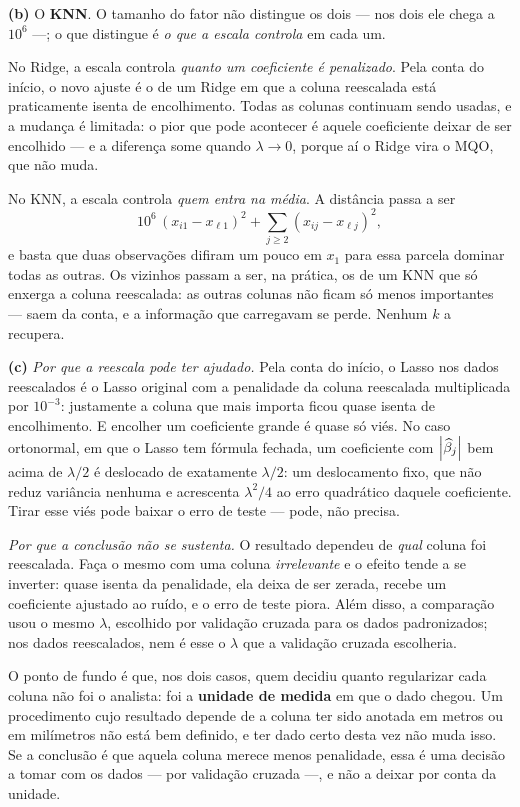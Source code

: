 \begin{solucao}
\smallskip
\textbf{(b)} O \textbf{KNN}. O tamanho do fator não distingue os dois --- nos dois ele
chega a $10^6$ ---; o que distingue é \emph{o que a escala controla} em cada um.

No Ridge, a escala controla \emph{quanto um coeficiente é penalizado}. Pela conta do
início, o novo ajuste é o de um Ridge em que a coluna reescalada está praticamente
isenta de encolhimento. Todas as colunas continuam sendo usadas, e a mudança é limitada:
o pior que pode acontecer é aquele coeficiente deixar de ser encolhido --- e a diferença
some quando $\lambda\to0$, porque aí o Ridge vira o MQO, que não muda.

No KNN, a escala controla \emph{quem entra na média}. A distância passa a ser
\[
  10^6\,(x_{i1}-x_{\ell1})^2+\sum_{j\ge2}(x_{ij}-x_{\ell j})^2 ,
\]
e basta que duas observações difiram um pouco em $x_1$ para essa parcela dominar todas
as outras. Os vizinhos passam a ser, na prática, os de um KNN que só enxerga a coluna
reescalada: as outras colunas não ficam só menos importantes --- saem da conta, e a
informação que carregavam se perde. Nenhum $k$ a recupera.

\smallskip
\textbf{(c)} \emph{Por que a reescala pode ter ajudado.} Pela conta do início, o Lasso
nos dados reescalados é o Lasso original com a penalidade da coluna reescalada
multiplicada por $10^{-3}$: justamente a coluna que mais importa ficou quase isenta de
encolhimento. E encolher um coeficiente grande é quase só viés. No caso ortonormal, em
que o Lasso tem fórmula fechada, um coeficiente com $\left\lvert \widehat\beta_j \right\rvert$ bem acima de
$\lambda/2$ é deslocado de exatamente $\lambda/2$: um deslocamento fixo, que não reduz
variância nenhuma e acrescenta $\lambda^2/4$ ao erro quadrático daquele coeficiente.
Tirar esse viés pode baixar o erro de teste --- pode, não precisa.

\emph{Por que a conclusão não se sustenta.} O resultado dependeu de \emph{qual} coluna
foi reescalada. Faça o mesmo com uma coluna \emph{irrelevante} e o efeito tende a se
inverter: quase isenta da penalidade, ela deixa de ser zerada, recebe um coeficiente
ajustado ao ruído, e o erro de teste piora. Além disso, a comparação usou o mesmo
$\lambda$, escolhido por validação cruzada para os dados padronizados; nos dados
reescalados, nem é esse o $\lambda$ que a validação cruzada escolheria.

O ponto de fundo é que, nos dois casos, quem decidiu quanto regularizar cada coluna não
foi o analista: foi a \textbf{unidade de medida} em que o dado chegou. Um procedimento
cujo resultado depende de a coluna ter sido anotada em metros ou em milímetros não está
bem definido, e ter dado certo desta vez não muda isso. Se a conclusão é que aquela
coluna merece menos penalidade, essa é uma decisão a tomar com os dados --- por
validação cruzada ---, e não a deixar por conta da unidade.
\end{solucao}
